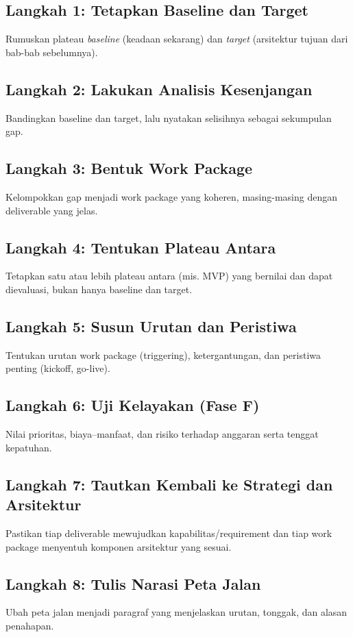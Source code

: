 \subsection{Langkah 1: Tetapkan Baseline dan Target}
Rumuskan plateau \emph{baseline} (keadaan sekarang) dan \emph{target} (arsitektur
tujuan dari bab-bab sebelumnya).

\subsection{Langkah 2: Lakukan Analisis Kesenjangan}
Bandingkan baseline dan target, lalu nyatakan selisihnya sebagai sekumpulan gap.

\subsection{Langkah 3: Bentuk Work Package}
Kelompokkan gap menjadi work package yang koheren, masing-masing dengan deliverable
yang jelas.

\subsection{Langkah 4: Tentukan Plateau Antara}
Tetapkan satu atau lebih plateau antara (mis. MVP) yang bernilai dan dapat
dievaluasi, bukan hanya baseline dan target.

\subsection{Langkah 5: Susun Urutan dan Peristiwa}
Tentukan urutan work package (triggering), ketergantungan, dan peristiwa penting
(kickoff, go-live).

\subsection{Langkah 6: Uji Kelayakan (Fase F)}
Nilai prioritas, biaya--manfaat, dan risiko terhadap anggaran serta tenggat
kepatuhan.

\subsection{Langkah 7: Tautkan Kembali ke Strategi dan Arsitektur}
Pastikan tiap deliverable mewujudkan kapabilitas/requirement dan tiap work package
menyentuh komponen arsitektur yang sesuai.

\subsection{Langkah 8: Tulis Narasi Peta Jalan}
Ubah peta jalan menjadi paragraf yang menjelaskan urutan, tonggak, dan alasan
penahapan.

